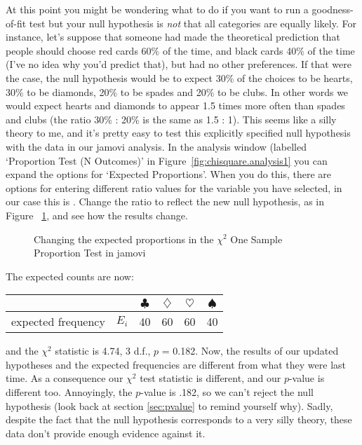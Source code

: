 At this point you might be wondering what to do if you want to run a goodness-of-fit test but your null hypothesis is {\it not} that all categories are equally likely. For instance, let's suppose that someone had made the theoretical prediction that people should choose red cards 60\% of the time, and black cards 40\% of the time (I've no idea why you'd predict that), but had no other preferences. If that were the case, the null hypothesis would be to expect 30\% of the choices to be hearts, 30\% to be diamonds, 20\% to be spades and 20\% to be clubs. In other words we would expect hearts and diamonds to appear 1.5 times more often than spades and clubs (the ratio 30\% : 20\% is the same as 1.5 : 1). This seems like a silly theory to me, and it's pretty easy to test this explicitly specified null hypothesis with the data in our jamovi analysis. In the analysis window (labelled `Proportion Test (N Outcomes)' in Figure~\ref{fig:chisquare.analysis1} you can expand the options for `Expected Proportions'. When you do this, there are options for entering different ratio values for the variable you have selected, in our case this is . Change the ratio to reflect the new null hypothesis, as in Figure~ \ref{fig:chisquare.analysis2}, and see how the results change. 

\begin{figure}[htb]
\begin{center}
\caption{Changing the expected proportions in the \texorpdfstring{$\chi^2$}{} One Sample Proportion Test in jamovi}
\label{fig:chisquare.analysis2}
\HR
\end{center}
\end{figure}

\noindent
The expected counts are now: 
\begin{center}
\begin{tabular}{rc|cccc}
& & $\clubsuit$ & $\diamondsuit$ & $\heartsuit$ & $\spadesuit$ \\ \hline 
expected frequency &$E_i$ & 40 & 60 & 60 & 40 \\ 
\end{tabular}
\end{center}
and the $\chi^2$ statistic is 4.74, 3 d.f., $p$ = 0.182. Now, the results of our updated hypotheses and the expected frequencies are different from what they were last time. As a consequence our $\chi^2$ test statistic is different, and our $p$-value is different too. Annoyingly, the $p$-value is .182, so we can't reject the null hypothesis (look back at section \ref{sec:pvalue} to remind yourself why). Sadly, despite the fact that the null hypothesis corresponds to a very silly theory, these data don't provide enough evidence against it.

